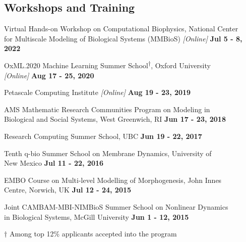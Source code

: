 \documentclass[margin,line]{res}
\newenvironment{list1}{
  \begin{list}{\ding{113}}{
      \setlength{\itemsep}{0in}
      \setlength{\parsep}{0in} \setlength{\parskip}{0in}
      \setlength{\topsep}{0in} \setlength{\partopsep}{0in}
      \setlength{\leftmargin}{0.17in}}}{\end{list}}
\begin{document}
\begin{resume}
\section{\sc Workshops and Training}

\begin{list1}
\setlength\itemsep{0.5em}
\item[] Virtual Hands-on Workshop on Computational Biophysics, National Center \\ for Multiscale Modeling of Biological Systems (MMBioS) \textit{[Online]} \hfill {\bf Jul 5 - 8, 2022}
\item[] OxML.2020 Machine Learning Summer School\textsuperscript{$\dagger$}, Oxford University \\ \textit{[Online]} \hfill {\bf Aug 17 - 25, 2020}
\item[] Petascale Computing Institute \textit{[Online]} \hfill {\bf Aug 19 - 23, 2019}
\item[] AMS Mathematic Research Communities Program on Modeling in \\ Biological and Social Systems, West Greenwich, RI \hfill {\bf Jun 17 - 23, 2018}
\item[] Research Computing Summer School, UBC \hfill {\bf Jun 19 - 22, 2017}
\item[] Tenth q-bio Summer School on Membrane Dynamics, University of \\ New Mexico \hfill {\bf Jul 11 - 22, 2016}
\item[] EMBO Course on Multi-level Modelling of Morphogenesis, John Innes \\ Centre, Norwich, UK  \hfill {\bf Jul 12 - 24, 2015}
\item[] Joint CAMBAM-MBI-NIMBioS Summer School on Nonlinear Dynamics \\ in Biological Systems, McGill University \hfill {\bf Jun 1 - 12, 2015}
\item[] $\dagger$ Among top 12\% applicants accepted into the program
\end{list1}








\end{resume}
\end{document}

